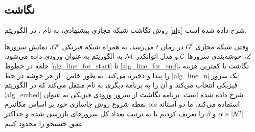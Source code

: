\subsection{نگاشت}
    روش نگاشت شبکه مجازی پیشنهادی، به نام \ourAlg، در الگوریتم  \ref{alg} شرح داده شده است.


وقتی شبکه مجازی $ G ^ {t} $ در زمان $ t $ می‌رسد، به همراه شبکه فیزیکی $ G ^ {p} $، نمایش سرورها $ Z $، خوشه‌بندی سرورها $\mathcal{C}$ و مدل اتوانکدر $\mathcal{M}$ به الگوریتم  \ourAlg  به عنوان ورودی داده می‌شود.
%
حلقه   در خطوط 
\ref {alg_line_for_start}
 تا 
\ref {alg_line_for_end}،
نگاشت با کمترین هزینه را پیدا و ذخیره می‌کند. به طور خاص  \ourAlg\ از هر خوشه در خط \ref{alg_line_n}  یک سرور فیزیکی انتخاب می‌کند و آن را به برنامه دیگری به نام  منتقل می‌کند که در الگوریتم \ref{alg_embed} شرح داده شده است.
برنامه نگاشت از سرور ورودی فیزیکی به عنوان نقطه شروع روش جاسازی خود بر اساس مکانیزم \gls{bfs} استفاده می‌کند.
ما دو آستانه  $\alpha\times|\mathcal{N}^{t}|$ و $\beta$ را تعریف کردیم تا به ترتیب تعداد کل سرورهای بازرسی شده و حداکثر عمق جستجو را محدود کنیم.

